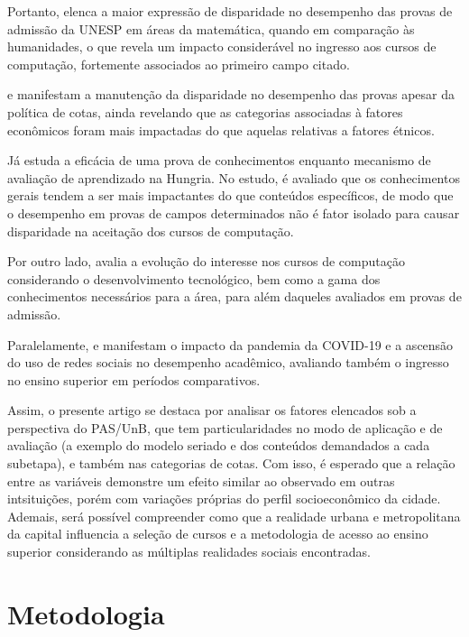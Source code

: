 \documentclass[12pt]{article}
\begin{document}
Portanto, \cite{Matheus2025Effectiveness} elenca a maior expressão de disparidade no desempenho das provas de admissão da UNESP em áreas da matemática, quando em comparação às humanidades, o que revela um impacto considerável no ingresso aos cursos de computação, fortemente associados ao primeiro campo citado.

\cite{Golgher2022The} e \cite{Mommert2020Exam} manifestam a manutenção da disparidade no desempenho das provas apesar da política de cotas, ainda revelando que as categorias associadas à fatores econômicos foram mais impactadas do que aquelas relativas a fatores étnicos.

Já \cite{Nagy2021Comprehensive} estuda a eficácia de uma prova de conhecimentos enquanto mecanismo de avaliação de aprendizado na Hungria. No estudo, é avaliado que os conhecimentos gerais tendem a ser mais impactantes do que conteúdos específicos, de modo que o desempenho em provas de campos determinados não é fator isolado para causar disparidade na aceitação dos cursos de computação.

Por outro lado, \cite{Camp2017Generation} avalia a evolução do interesse nos cursos de computação considerando o desenvolvimento tecnológico, bem como a gama dos conhecimentos necessários para a área, para além daqueles avaliados em provas de admissão.

Paralelamente, \cite{Sobaih2022Higher} e \cite{Iqbal2021The} manifestam o impacto da pandemia da COVID-19 e a ascensão do uso de redes sociais no desempenho acadêmico, avaliando também o ingresso no ensino superior em períodos comparativos.

Assim, o presente artigo se destaca por analisar os fatores elencados sob a perspectiva do PAS/UnB, que tem particularidades no modo de aplicação e de avaliação (a exemplo do modelo seriado e dos conteúdos demandados a cada subetapa), e também nas categorias de cotas. Com isso, é esperado que a relação entre as variáveis demonstre um efeito similar ao observado em outras intsituições, porém com variações próprias do perfil socioeconômico da cidade. Ademais, será possível compreender como que a realidade urbana e metropolitana da capital influencia a seleção de cursos e a metodologia de acesso ao ensino superior considerando as múltiplas realidades sociais encontradas.

\section{Metodologia}
\end{document}
